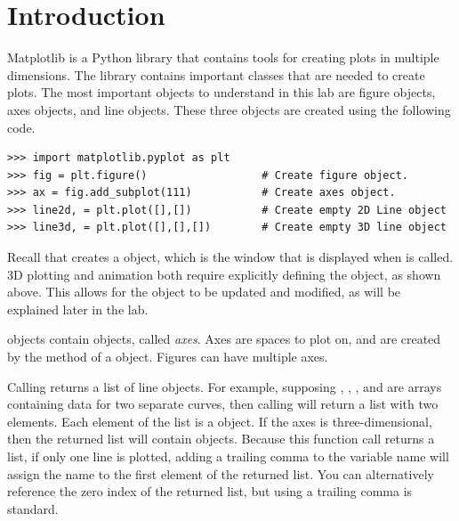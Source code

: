 \label{lab:lab0}

 
\section*{Introduction}
Matplotlib is a Python library that contains tools for creating plots in multiple dimensions.
The library contains important classes that are needed to create plots.
The most important objects to understand in this lab are figure objects, axes objects, and line objects. These three objects are created using the following code.

\begin{lstlisting}
>>> import matplotlib.pyplot as plt
>>> fig = plt.figure()                  # Create figure object.
>>> ax = fig.add_subplot(111)           # Create axes object.
>>> line2d, = plt.plot([],[])           # Create empty 2D Line object
>>> line3d, = plt.plot([],[],[])        # Create empty 3D line object
\end{lstlisting}

Recall that  creates a  object, which is the window that is displayed when  is called.
3D plotting and animation both require explicitly defining the  object, as shown above.
This allows for the object to be updated and modified, as will be explained later in the lab.

 objects contain  objects, called \textit{axes}. Axes are spaces to plot on, and are created by the  method of a  object. Figures can have multiple axes. 

Calling  returns a list of line objects.
For example, supposing , , , and  are arrays containing data for two separate curves, then calling  will return a list with two elements.
Each element of the list is a  object.
If the axes is three-dimensional, then the returned list will contain  objects.
Because this function call returns a list, if only one line is plotted, adding a trailing comma to the variable name will assign the name to the first element of the returned list.
You can alternatively reference the zero index of the returned list, but using a trailing comma is standard.

